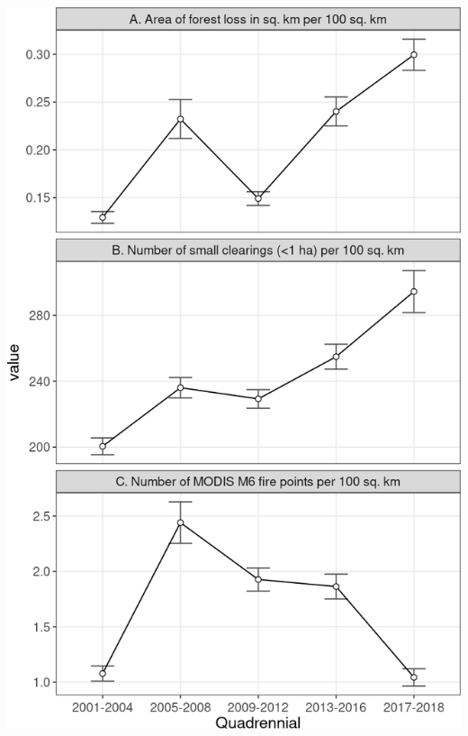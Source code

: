 \documentclass[10pt,landscape,a3paper]{article}
\begin{document}
\begin{center}\includegraphics{img/modelling/aa-eda-ts-14} \end{center}
\end{document}
